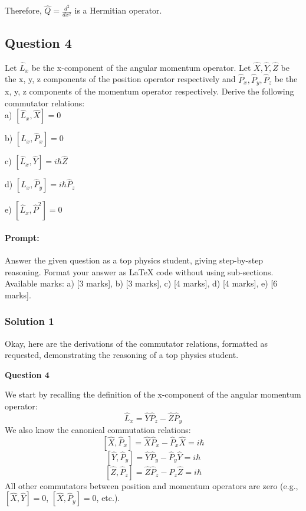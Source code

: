 \documentclass{article}
\begin{document}
Therefore, $\hat{Q} = \frac{d^2}{dx^2}$ is a Hermitian operator.


\subsection{Question 4}

Let $\hat{L}_x$ be the x-component of the angular momentum operator. Let $\hat{X}, \hat{Y}, \hat{Z}$ be the x, y, z components of the position operator respectively and $\hat{P}_x, \hat{P}_y, \hat{P}_z$ be the x, y, z components of the momentum operator respectively. Derive the following commutator relations:   \\

a) $\left[\hat{L}_x, \hat{X}\right] = 0$  

b) $\left[\hat{L}_x, \hat{P}_x\right] = 0$  

c) $\left[\hat{L}_x, \hat{Y}\right] = i\hbar \hat{Z}$  

d) $\left[\hat{L}_x, \hat{P}_y\right] = i\hbar \hat{P}_z$  

e) $\left[\hat{L}_x, \hat{P}^2\right] = 0$

\paragraph{Prompt: \\} 
Answer the given question as a top physics student, giving step-by-step reasoning. Format your answer as LaTeX code without using sub-sections. Available marks: a) [3 marks], b) [3 marks], c) [4 marks], d) [4 marks], e) [6 marks].

\subsubsection{Solution 1}
Okay, here are the derivations of the commutator relations, formatted as requested, demonstrating the reasoning of a top physics student.

\begin{center}
\textbf{Question 4}
\end{center}

We start by recalling the definition of the x-component of the angular momentum operator:
\[ \hat{L}_x = \hat{Y}\hat{P}_z - \hat{Z}\hat{P}_y \]
We also know the canonical commutation relations:
\[ [\hat{X},\hat{P}_x] = \hat{X}\hat{P}_x - \hat{P}_x\hat{X} = i\hbar \]
\[ [\hat{Y},\hat{P}_y] = \hat{Y}\hat{P}_y - \hat{P}_y\hat{Y} = i\hbar \]
\[ [\hat{Z},\hat{P}_z] = \hat{Z}\hat{P}_z - \hat{P}_z\hat{Z} = i\hbar \]
All other commutators between position and momentum operators are zero (e.g., $[\hat{X},\hat{Y}] = 0$, $[\hat{X}, \hat{P}_y] = 0$, etc.).
\end{document}
